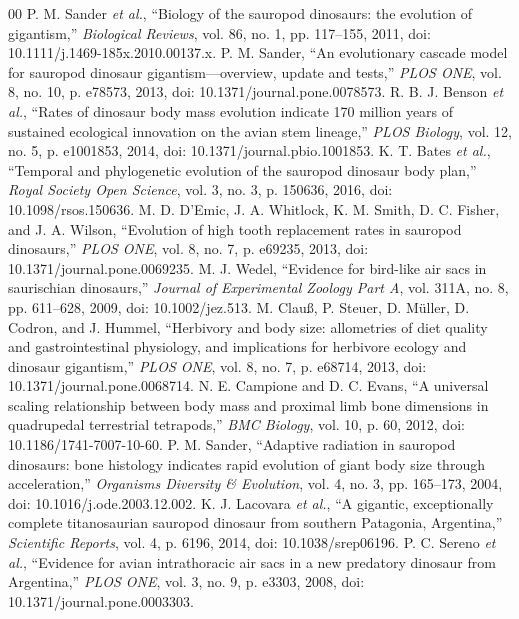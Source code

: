 \documentclass[conference]{IEEEtran}
\begin{document}
\begin{thebibliography}{00}
 P. M. Sander \emph{et al.}, ``Biology of the sauropod dinosaurs: the evolution of gigantism,'' \emph{Biological Reviews}, vol. 86, no. 1, pp. 117--155, 2011, doi: 10.1111/j.1469-185x.2010.00137.x.
 P. M. Sander, ``An evolutionary cascade model for sauropod dinosaur gigantism---overview, update and tests,'' \emph{PLOS ONE}, vol. 8, no. 10, p. e78573, 2013, doi: 10.1371/journal.pone.0078573.
 R. B. J. Benson \emph{et al.}, ``Rates of dinosaur body mass evolution indicate 170 million years of sustained ecological innovation on the avian stem lineage,'' \emph{PLOS Biology}, vol. 12, no. 5, p. e1001853, 2014, doi: 10.1371/journal.pbio.1001853.
 K. T. Bates \emph{et al.}, ``Temporal and phylogenetic evolution of the sauropod dinosaur body plan,'' \emph{Royal Society Open Science}, vol. 3, no. 3, p. 150636, 2016, doi: 10.1098/rsos.150636.
 M. D. D'Emic, J. A. Whitlock, K. M. Smith, D. C. Fisher, and J. A. Wilson, ``Evolution of high tooth replacement rates in sauropod dinosaurs,'' \emph{PLOS ONE}, vol. 8, no. 7, p. e69235, 2013, doi: 10.1371/journal.pone.0069235.
 M. J. Wedel, ``Evidence for bird-like air sacs in saurischian dinosaurs,'' \emph{Journal of Experimental Zoology Part A}, vol. 311A, no. 8, pp. 611--628, 2009, doi: 10.1002/jez.513.
 M. Clau\ss, P. Steuer, D. M\"uller, D. Codron, and J. Hummel, ``Herbivory and body size: allometries of diet quality and gastrointestinal physiology, and implications for herbivore ecology and dinosaur gigantism,'' \emph{PLOS ONE}, vol. 8, no. 7, p. e68714, 2013, doi: 10.1371/journal.pone.0068714.
 N. E. Campione and D. C. Evans, ``A universal scaling relationship between body mass and proximal limb bone dimensions in quadrupedal terrestrial tetrapods,'' \emph{BMC Biology}, vol. 10, p. 60, 2012, doi: 10.1186/1741-7007-10-60.
 P. M. Sander, ``Adaptive radiation in sauropod dinosaurs: bone histology indicates rapid evolution of giant body size through acceleration,'' \emph{Organisms Diversity \& Evolution}, vol. 4, no. 3, pp. 165--173, 2004, doi: 10.1016/j.ode.2003.12.002.
 K. J. Lacovara \emph{et al.}, ``A gigantic, exceptionally complete titanosaurian sauropod dinosaur from southern Patagonia, Argentina,'' \emph{Scientific Reports}, vol. 4, p. 6196, 2014, doi: 10.1038/srep06196.
 P. C. Sereno \emph{et al.}, ``Evidence for avian intrathoracic air sacs in a new predatory dinosaur from Argentina,'' \emph{PLOS ONE}, vol. 3, no. 9, p. e3303, 2008, doi: 10.1371/journal.pone.0003303.
\end{thebibliography}
\end{document}
